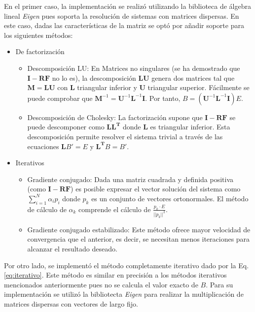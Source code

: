 En el primer caso, la implementación se realizó utilizando la biblioteca de álgebra lineal \textit{Eigen} pues soporta la resolución de sistemas con matrices dispersas. En este caso, dadas las características de la matriz se optó por añadir soporte para los siguientes métodos:

\begin{itemize}
	\item{De factorización}
		\begin{itemize}
			\item{Descomposición LU:} En Matrices no singulares (se ha demostrado que $\mathbf{I - RF}$ no lo es), la descomposición $\mathbf{LU}$ genera dos matrices tal que $\mathbf{M} = \mathbf{LU}$ con $\mathbf{L}$ triangular inferior y $\mathbf{U}$ triangular superior. Fácilmente se puede comprobar que  $\mathbf{M}^{-1} = \mathbf{U}^{-1} \mathbf{L}^{-1} \mathbf{I}$. Por tanto, $B =(\mathbf{U}^{-1} \mathbf{L}^{-1} \mathbf{I})E$. 
			\item{Descomposición de Cholesky:} La factorización supone que  $\mathbf{I - RF}$ se puede descomponer como  $\mathbf{LL^{T}}$ donde  $\mathbf{L}$ es triangular inferior. Esta descomposición permite resolver el sistema trivial a través de las ecuaciones $\mathbf{L}B' = E$ y $\mathbf{L^{T}}B = B'$.
			\end{itemize}
	\item{Iterativos}
			\begin{itemize}
			\item Gradiente conjugado:
				Dada una matriz cuadrada y definida positiva (como $\mathbf{I - RF}$) es posible expresar el vector solución del sistema como $\sum_{i=1}^{N} \alpha_{i}p_{i}$ donde $p_{k}$ es un conjunto de vectores ortonormales. El método de cálculo de $\alpha_{k}$ comprende el cálculo de $\frac{p_{k} \cdot E}{||p_{k}||^{2}}$.			\item Gradiente conjugado estabilizado: Este método ofrece mayor velocidad de convergencia que el anterior, es decir, se necesitan menos iteraciones para alcanzar el resultado deseado. 
		\end{itemize}
\end{itemize}

Por otro lado, se implementó el método completamente iterativo dado por la Eq. \eqref{eq:iterativo}. Este método es similar en precisión a los métodos iterativos  mencionados anteriormente pues no se calcula el valor exacto de $B$. Para su implementación se utilizó la bibliotecta \textit{Eigen} para realizar la multiplicación de matrices dispersas con vectores de largo fijo.

